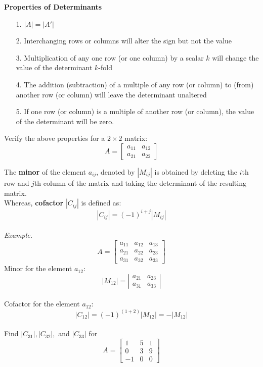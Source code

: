 \documentclass{./../../Latex/handout}
\begin{document}
\newpage
\textbf{Properties of Determinants}
\begin{itemize}
\item[1.] $ |A| = |A'|$ 
\item[2.] Interchanging rows or columns will alter the sign but not the value
\item[3.] Multiplication of any one row (or one column) by a scalar $k$ will change the value of the determinant $k$-fold
\item[4.] The addition (subtraction) of a multiple of any row (or column) to (from) another row (or column) will leave the determinant unaltered
\item[5.] If one row (or column) is a multiple of another row (or column), the value of the determinant will be zero. 
\end{itemize}

\vspace{2em}
Verify the above properties for a $2 \times 2$ matrix: 
 $$ A=\left[\begin{array}{ll}a_{11} & a_{12} \\ a_{21} & a_{22}\end{array}\right] $$


\newpage
The \textbf{minor} of the element $a_{ij}$, denoted by $|M_{ij}|$ is obtained by deleting the $i$th row and $j$th column of the matrix and taking the determinant of the resulting matrix. \\

Whereas, \textbf{cofactor} $|C_{ij}|$ is defined as:
$$ |C_{ij}| = (-1)^{i+j} |M_{ij}| $$\\

\textit{Example.} $$
A=\left[\begin{array}{lll}
a_{11} & a_{12} & a_{13} \\
a_{21} & a_{22} & a_{23} \\
a_{31} & a_{32} & a_{33}
\end{array}\right]
$$
Minor for the element $a_{12}$: 
$$ \left|M_{12}\right|=\left|\begin{array}{ll}a_{21} & a_{23} \\ a_{31} & a_{33}\end{array}\right| $$ \\
Cofactor for the element $a_{12}$: 
$$ \left|C_{12}\right| = (-1)^{(1+2)}  \left|M_{12}\right| = -  \left|M_{12}\right| $$ \\
Find $|C_{31}|,  |C_{32}|,$ and $|C_{33}|$ for \[
A=\left[\begin{array}{ccc}
1 & 5 & 1 \\
0 & 3 & 9 \\
-1 & 0 & 0
\end{array}\right]
\]
\end{document}
